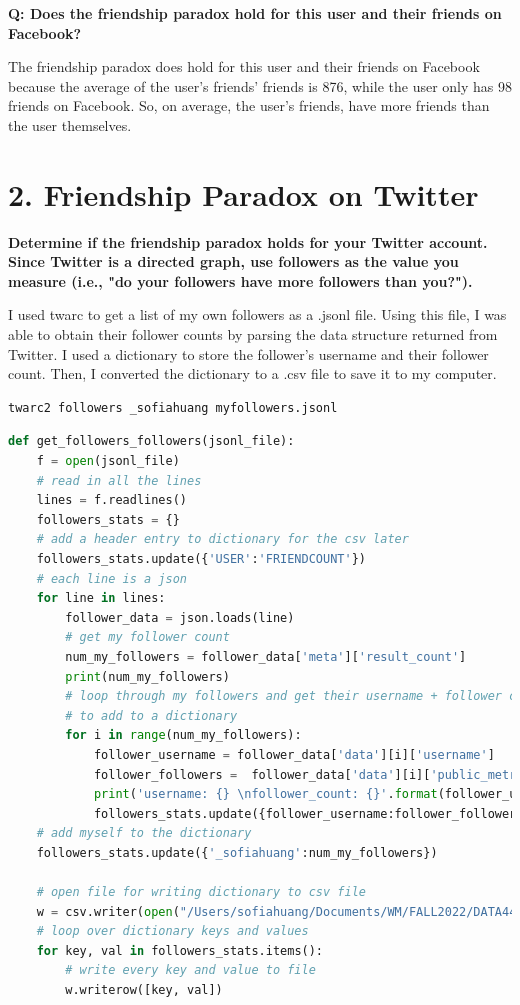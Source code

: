 \documentclass[12pt]{article}
\begin{document}
\noindent\textbf{Q: Does the friendship paradox hold for this user and their friends on Facebook?}

The friendship paradox does hold for this user and their friends on Facebook because the average of the user's friends' friends is 876, while the user only has 98 friends on Facebook. So, on average, the user's friends, have more friends than the user themselves.

\section*{2. Friendship Paradox on Twitter}
\noindent \textbf{Determine if the friendship paradox holds for your Twitter account. Since Twitter is a directed graph, use followers as the value you measure (i.e., "do your followers have more followers than you?").}

I used twarc to get a list of my own followers as a .jsonl file. Using this file, I was able to obtain their follower counts by parsing the data structure returned from Twitter. I used a dictionary to store the follower's username and their follower count. Then, I converted the dictionary to a .csv file to save it to my computer.

\begin{lstlisting}[language=bash, caption=obtaining my own followers using twarc, label=lst:copy]
twarc2 followers _sofiahuang myfollowers.jsonl
\end{lstlisting}

\begin{lstlisting}[language=python, caption=obtaining my followers' follower count, label=lst:copy]
def get_followers_followers(jsonl_file):
    f = open(jsonl_file)
    # read in all the lines
    lines = f.readlines()  
    followers_stats = {}
    # add a header entry to dictionary for the csv later
    followers_stats.update({'USER':'FRIENDCOUNT'})
    # each line is a json 
    for line in lines:
        follower_data = json.loads(line)
        # get my follower count
        num_my_followers = follower_data['meta']['result_count']
        print(num_my_followers)
        # loop through my followers and get their username + follower count
        # to add to a dictionary
        for i in range(num_my_followers):
            follower_username = follower_data['data'][i]['username']
            follower_followers =  follower_data['data'][i]['public_metrics']['followers_count']
            print('username: {} \nfollower_count: {}'.format(follower_username, follower_followers))
            followers_stats.update({follower_username:follower_followers})
    # add myself to the dictionary
    followers_stats.update({'_sofiahuang':num_my_followers})

    # open file for writing dictionary to csv file
    w = csv.writer(open("/Users/sofiahuang/Documents/WM/FALL2022/DATA440/followers_followers.csv", "w"))
    # loop over dictionary keys and values
    for key, val in followers_stats.items():
        # write every key and value to file
        w.writerow([key, val])
\end{lstlisting}
\end{document}
